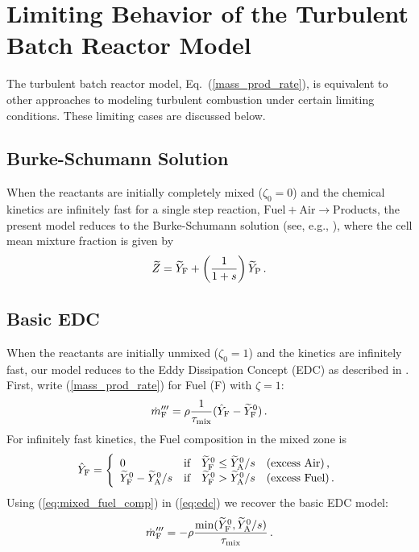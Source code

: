 \chapter{Limiting Behavior of the Turbulent Batch Reactor Model}
\label{app:eddy_dissipation_concept}
\label{source_term}

The turbulent batch reactor model, Eq.~(\ref{mass_prod_rate}), is equivalent to other approaches to modeling turbulent combustion under certain limiting conditions.  These limiting cases are discussed below.

\section{Burke-Schumann Solution}

When the reactants are initially completely mixed ($\zeta_0=0$) and the chemical kinetics are infinitely fast for a single step reaction, $\mbox{Fuel} + \mbox{Air} \rightarrow \mbox{Products}$, the present model reduces to the Burke-Schumann solution (see, e.g., \cite{Turns:1996}), where the cell mean mixture fraction is given by
\begin{equation}
\label{eq:mixture_fraction}
\widetilde{Z} = \widetilde{Y}_{\rm F} + \left(\frac{1}{1+s}\right) \widetilde{Y}_{{\rm P}} \,\mbox{.}
\end{equation}

\section{Basic EDC}

When the reactants are initially unmixed ($\zeta_0=1$) and the kinetics are infinitely fast, our model reduces to the Eddy Dissipation Concept (EDC) as described in \cite{Poinsot:TNC}.  First, write (\ref{mass_prod_rate}) for Fuel (F) with $\zeta = 1$:
\begin{equation}
\label{eq:src_zeta_1}
\dot{m}^{\prime\prime\prime}_{\rm F} = \rho \frac{1}{\tau_{\rm mix}} (\hat{Y}_{\rm F} - \widetilde{Y}_{\rm F}^0) \,\mbox{.}
\end{equation}
For infinitely fast kinetics, the Fuel composition in the mixed zone is
\begin{equation}
\label{eq:mixed_fuel_comp}
\hat{Y}_{\rm F} = \left\{ \begin{array}{ll} 0 & \mbox{if} \quad \widetilde{Y}_{\rm F}^0 \le \widetilde{Y}_{{\rm A}}^0/s \quad \mbox{(excess Air)}  \,\mbox{,} \\
\widetilde{Y}_{\rm F}^0 - \widetilde{Y}_{{\rm A}}^0/s & \mbox{if} \quad \widetilde{Y}_{\rm F}^0 > \widetilde{Y}_{{\rm A}}^0/s \quad \mbox{(excess Fuel)}  \,\mbox{.} \end{array} \right.
\end{equation}
Using (\ref{eq:mixed_fuel_comp}) in (\ref{eq:edc}) we recover the basic EDC model:
\begin{equation}
\label{eq:edc_basic}
\dot{m}^{\prime\prime\prime}_{\rm F} = - \rho \frac{\min(\widetilde{Y}_{\rm F}^0,\widetilde{Y}_{{\rm A}}^0/s)}{\tau_{\rm mix}} \,\mbox{.}
\end{equation}

